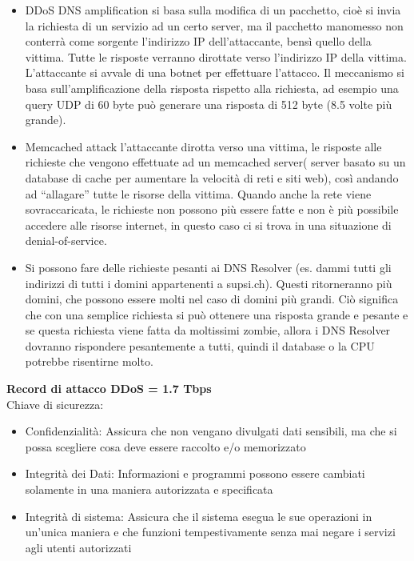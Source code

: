 \documentclass[8pt]{extarticle}
\begin{document}
\begin{itemize}
    \item DDoS DNS amplification si basa sulla modifica di un pacchetto, cioè si invia la richiesta di un servizio ad un certo server, 
    ma il pacchetto manomesso non conterrà come sorgente l’indirizzo IP dell’attaccante, bensì quello della vittima. Tutte le risposte 
    verranno dirottate verso l’indirizzo IP della vittima. L’attaccante si avvale di una botnet per effettuare l’attacco. Il meccanismo 
    si basa sull’amplificazione della risposta rispetto alla richiesta, ad esempio una query UDP di 60 byte può generare una risposta 
    di 512 byte (8.5 volte più grande).
    \item Memcached attack l’attaccante dirotta verso una vittima, le risposte alle richieste che vengono effettuate ad un memcached 
    server( server basato su un database di cache per aumentare la velocità di reti e siti web), così andando ad “allagare” tutte le 
    risorse della vittima. Quando anche la rete viene sovraccaricata, le richieste non possono più essere fatte e non è più possibile 
    accedere alle risorse internet, in questo caso ci si trova in una situazione di denial-of-service.
    \item Si possono fare delle richieste pesanti ai DNS Resolver (es. dammi tutti gli indirizzi di tutti i domini appartenenti a supsi.ch). Questi ritorneranno più domini, che possono essere molti nel caso di domini più grandi. Ciò significa che con una semplice richiesta si può ottenere una risposta grande e pesante e se questa richiesta viene fatta da moltissimi zombie, allora i DNS Resolver dovranno rispondere pesantemente a tutti, quindi il database o la CPU potrebbe risentirne molto.
\end{itemize}
\textbf{Record di attacco DDoS = 1.7 Tbps} \\
Chiave di sicurezza:
\begin{itemize}
    \item Confidenzialità: Assicura che non vengano divulgati dati sensibili, ma che si possa scegliere cosa deve essere raccolto e/o memorizzato
    \item Integrità dei Dati: Informazioni e programmi possono essere cambiati solamente in una maniera autorizzata e specificata
    \item Integrità di sistema: Assicura che il sistema esegua le sue operazioni in un’unica maniera e che funzioni tempestivamente senza mai 
    negare i servizi agli utenti autorizzati
\end{itemize}
\end{document}
